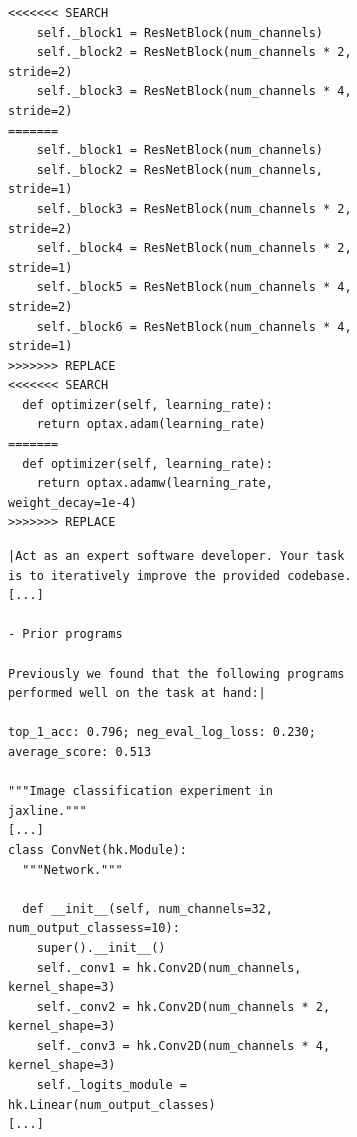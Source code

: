 \begin{figure}[htbp]
\begin{minipage}[c]{0.48\textwidth}
\begin{subfigure}[b]{\textwidth}
\begin{verbatim}
<<<<<<< SEARCH
    self._block1 = ResNetBlock(num_channels)
    self._block2 = ResNetBlock(num_channels * 2, stride=2)
    self._block3 = ResNetBlock(num_channels * 4, stride=2)
=======
    self._block1 = ResNetBlock(num_channels)
    self._block2 = ResNetBlock(num_channels, stride=1)
    self._block3 = ResNetBlock(num_channels * 2, stride=2)
    self._block4 = ResNetBlock(num_channels * 2, stride=1)
    self._block5 = ResNetBlock(num_channels * 4, stride=2)
    self._block6 = ResNetBlock(num_channels * 4, stride=1)
>>>>>>> REPLACE
<<<<<<< SEARCH
  def optimizer(self, learning_rate):
    return optax.adam(learning_rate)
=======
  def optimizer(self, learning_rate):
    return optax.adamw(learning_rate, weight_decay=1e-4)
>>>>>>> REPLACE
\end{verbatim}
            \addtocounter{subfigure}{+1}
            \captionsetup{justification=centering, singlelinecheck=false}
            \caption{}
            \label{fig:grounding-llm}
        \end{subfigure}
    \end{minipage}
    \hfill %
    \begin{minipage}[c]{0.48\textwidth} %
        \centering
        \begin{subfigure}{\textwidth} %
            \centering

\begin{verbatim}
|Act as an expert software developer. Your task is to iteratively improve the provided codebase. [...]

- Prior programs

Previously we found that the following programs performed well on the task at hand:|

top_1_acc: 0.796; neg_eval_log_loss: 0.230; average_score: 0.513

"""Image classification experiment in jaxline."""
[...]
class ConvNet(hk.Module):
  """Network."""

  def __init__(self, num_channels=32, num_output_classess=10):
    super().__init__()
    self._conv1 = hk.Conv2D(num_channels, kernel_shape=3)
    self._conv2 = hk.Conv2D(num_channels * 2, kernel_shape=3)
    self._conv3 = hk.Conv2D(num_channels * 4, kernel_shape=3)
    self._logits_module = hk.Linear(num_output_classes)
[...]



\end{verbatim}
\end{subfigure}
\end{minipage}
\end{figure}
